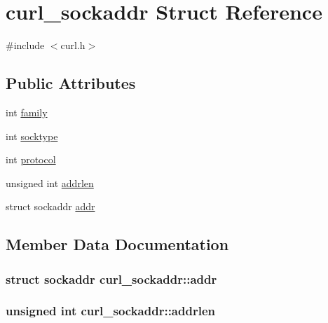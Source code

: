 \hypertarget{structcurl__sockaddr}{}\section{curl\+\_\+sockaddr Struct Reference}
\label{structcurl__sockaddr}


{\ttfamily \#include $<$curl.\+h$>$}

\subsection*{Public Attributes}
\begin{DoxyCompactItemize}
\item 
int \hyperlink{structcurl__sockaddr_ad5406982faaa070b7c928686ed31fdae}{family}
\item 
int \hyperlink{structcurl__sockaddr_a2c6c2c2083f3436c8b46c7d658be9aca}{socktype}
\item 
int \hyperlink{structcurl__sockaddr_ab59abd90c680d1f37217c3f65ea58a02}{protocol}
\item 
unsigned int \hyperlink{structcurl__sockaddr_a284d80484bad142443fe26ddbe427ff2}{addrlen}
\item 
struct sockaddr \hyperlink{structcurl__sockaddr_afb5fbd416cdfa9f83791e9a23e5266c2}{addr}
\end{DoxyCompactItemize}


\subsection{Member Data Documentation}
\hypertarget{structcurl__sockaddr_afb5fbd416cdfa9f83791e9a23e5266c2}{}
\subsubsection[{addr}]{\setlength{\rightskip}{0pt plus 5cm}struct sockaddr curl\+\_\+sockaddr\+::addr}\label{structcurl__sockaddr_afb5fbd416cdfa9f83791e9a23e5266c2}
\hypertarget{structcurl__sockaddr_a284d80484bad142443fe26ddbe427ff2}{}
\subsubsection[{addrlen}]{\setlength{\rightskip}{0pt plus 5cm}unsigned int curl\+\_\+sockaddr\+::addrlen}\label{structcurl__sockaddr_a284d80484bad142443fe26ddbe427ff2}
\hypertarget{structcurl__sockaddr_ad5406982faaa070b7c928686ed31fdae}{}
